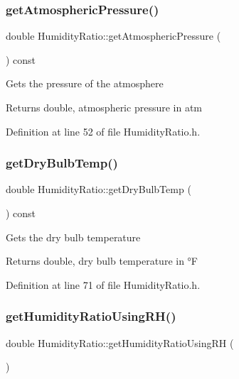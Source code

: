 \subsubsection{\texorpdfstring{get\+Atmospheric\+Pressure()}{getAtmosphericPressure()}}
{\footnotesize\ttfamily double Humidity\+Ratio\+::get\+Atmospheric\+Pressure (\begin{DoxyParamCaption}{ }\end{DoxyParamCaption}) const\hspace{0.3cm}{\ttfamily [inline]}}

Gets the pressure of the atmosphere

\begin{DoxyReturn}{Returns}
double, atmospheric pressure in atm 
\end{DoxyReturn}


Definition at line 52 of file Humidity\+Ratio.\+h.

\mbox{\label{class_humidity_ratio_a737b2faf32e5271b8062b175e1d018a9}} 
\subsubsection{\texorpdfstring{get\+Dry\+Bulb\+Temp()}{getDryBulbTemp()}}
{\footnotesize\ttfamily double Humidity\+Ratio\+::get\+Dry\+Bulb\+Temp (\begin{DoxyParamCaption}{ }\end{DoxyParamCaption}) const\hspace{0.3cm}{\ttfamily [inline]}}

Gets the dry bulb temperature

\begin{DoxyReturn}{Returns}
double, dry bulb temperature in °F 
\end{DoxyReturn}


Definition at line 71 of file Humidity\+Ratio.\+h.

\mbox{\label{class_humidity_ratio_af711463f09fa91544c2b69dc24817fed}} 
\subsubsection{\texorpdfstring{get\+Humidity\+Ratio\+Using\+R\+H()}{getHumidityRatioUsingRH()}}
{\footnotesize\ttfamily double Humidity\+Ratio\+::get\+Humidity\+Ratio\+Using\+RH (\begin{DoxyParamCaption}{ }\end{DoxyParamCaption})}


